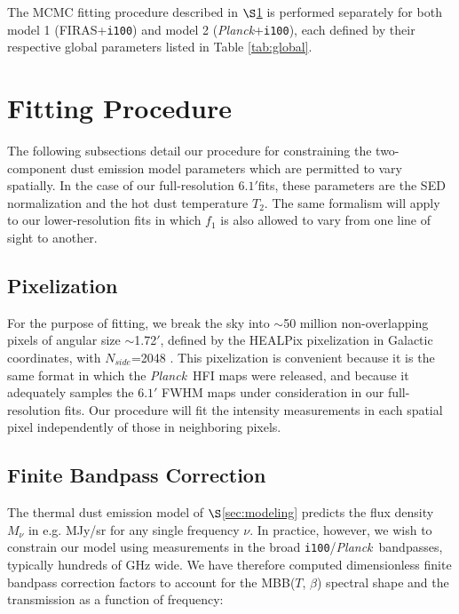 \documentclass{emulateapj}
\newcommand{\PLANCK}{{\it Planck}}
\begin{document}
The MCMC fitting procedure described in $\S$\ref{sec:fitting} is performed
separately for both model 1 (FIRAS+\verb|i100|) and model 2 
(\PLANCK+\verb|i100|), each defined by their respective global parameters 
listed in Table \ref{tab:global}.




\section{Fitting Procedure}
\label{sec:fitting}

The following subsections detail our procedure for constraining the 
two-component dust emission model parameters which are permitted to vary
spatially. In the case of our full-resolution $6.1'$fits, these parameters
are the SED normalization and the hot dust temperature $T_2$. The same 
formalism will apply to our lower-resolution fits in which $f_1$ is also 
allowed to vary from one line of sight to another.


\subsection{Pixelization}
\label{sec:pix}
For the purpose of fitting, we break the sky into $\sim$50 million 
non-overlapping pixels of angular size $\sim$1.72$'$, defined by the HEALPix 
pixelization in Galactic coordinates, with $N_{side}$=2048 \citep{healpix}. 
This pixelization is convenient because it is the same format in which the 
\PLANCK~HFI maps were released, and because it adequately samples the $6.1'$ 
FWHM maps under consideration in our full-resolution fits. Our procedure will 
fit the intensity measurements in each spatial pixel independently of those in 
neighboring pixels.

\subsection{Finite Bandpass Correction}
\label{sec:bpcorr}
The thermal dust emission model of $\S$\ref{sec:modeling} predicts the 
flux density $M_{\nu}$ in e.g. MJy/sr for any single frequency $\nu$. In 
practice, however, we wish to constrain our model using measurements in the 
broad \verb|i100|/\PLANCK~bandpasses, typically hundreds of GHz wide. We have 
therefore computed dimensionless finite bandpass correction factors to 
account for the MBB($T$, $\beta$) spectral shape and the transmission as a 
function of frequency:
\end{document}
